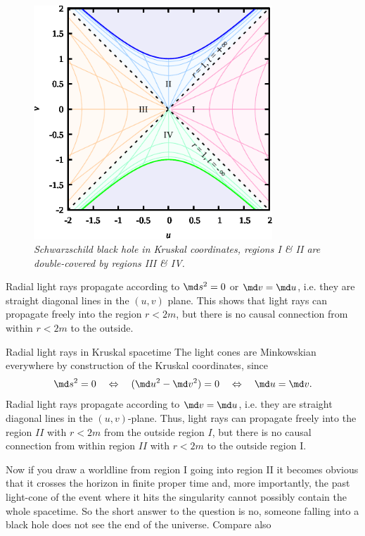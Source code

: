 \begin{figure}[h]
	\label{fig:Schwarzschildbh}
	\centering
	\includegraphics[width=0.8\textwidth]{gfx/fig10-2.pdf}
	\caption{\itshape Schwarzschild black hole in Kruskal coordinates, regions I \& II are double-covered by regions III \& IV.}
\end{figure}
Radial light rays propagate according to $\md s^2 =0$ or $\md v = \md u$, i.e. they are straight diagonal lines in the $(u,v)$ plane. This shows that light rays can propagate freely into the region $r<2m$, but there is no causal connection from within $r<2m$ to the outside.
\begin{mybox}{Radial light rays in Kruskal spacetime}
	The light cones are Minkowskian everywhere by construction of the Kruskal coordinates, since 
	\begin{equation*}
		\md s^2 =  0 \quad \Leftrightarrow \quad (\md u^2 - \md v^2 ) = 0 \quad \Leftrightarrow \quad \md u =\md v.
	\end{equation*}
	Radial light rays propagate according to $\md v = \md u$, i.e. they are straight diagonal lines in the
	$(u, v)$-plane. Thus, light rays can propagate freely into the region $II$ with $r < 2m$ from the outside
	region $I$, but there is no causal connection from within region $II$ with $r < 2m$ to the outside
	region I.
\end{mybox}
Now if you draw a worldline from region I going into region II it becomes obvious that it crosses the horizon in finite proper time and, more importantly, the past light-cone of the event where it hits the singularity cannot possibly contain the whole spacetime. So the short answer to the question is no, someone falling into a black hole does not see the end of the universe. Compare also

